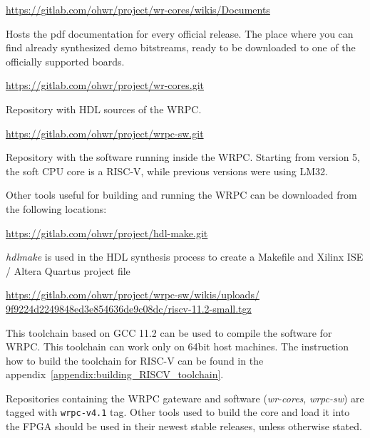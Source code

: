 \documentclass[a4paper, 12pt]{article}
\renewcommand{\_}{\underscore\allowbreak}
\begin{document}
\begin{itemize*}

\item \url{https://gitlab.com/ohwr/project/wr-cores/wikis/Documents}

  Hosts the pdf documentation for every official release.
  The place where you can find already synthesized demo bitstreams,
  ready to be downloaded to one of the officially supported boards.

\item \url{https://gitlab.com/ohwr/project/wr-cores.git}

  Repository with HDL sources of the WRPC.

\item \url{https://gitlab.com/ohwr/project/wrpc-sw.git}

  Repository with the software running inside the WRPC. Starting from
  version 5, the soft CPU core is a RISC-V, while previous versions were
  using LM32.

\end{itemize*}
Other tools useful for building and running the WRPC can be downloaded from the
following locations:

\begin{itemize*}

\item \url{https://gitlab.com/ohwr/project/hdl-make.git}

  \textit{hdlmake} is used in the HDL synthesis process to create a Makefile and
  Xilinx ISE / Altera Quartus project file

\item {\href{https://gitlab.com/ohwr/project/wrpc-sw/wikis/uploads/9f9224d2249848ed3e854636de9c08dc/riscv-11.2-small.tgz}{https://gitlab.com/ohwr/project/wrpc-sw/wikis/uploads/}\\
\href{https://gitlab.com/ohwr/project/wrpc-sw/wikis/uploads/9f9224d2249848ed3e854636de9c08dc/riscv-11.2-small.tgz}{9f9224d2249848ed3e854636de9c08dc/riscv-11.2-small.tgz}}

  This toolchain based on GCC 11.2 can be used to compile the software
  for WRPC. This toolchain can work only on 64bit host machines. The
  instruction how to build the toolchain for RISC-V can be found in
  the appendix~\ref{appendix:building_RISCV_toolchain}.

\end{itemize*}
Repositories containing the WRPC gateware and software (\textit{wr-cores},
\textit{wrpc-sw}) are tagged with \texttt{wrpc-v4.1} tag. Other tools used to
build the core and load it into the FPGA should be used in their newest stable
releases, unless otherwise stated.
\end{document}
